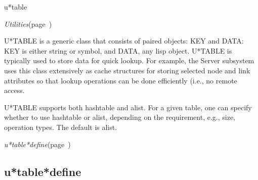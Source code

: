 \begin{description}
\item [Name:]  u*table

\item [Layer:] {\sl Utilities}\hfill(page~\pageref{Utilities})

\item [Description:]

U*TABLE is a generic class that consists of paired objects: KEY
and DATA: KEY is either string or symbol, and DATA, any lisp
object.  U*TABLE is typically used to store data for quick
lookup. For example, the Server subsystem uses this class
extensively as cache structures for storing selected node and
link attributes so that lookup operations can be done
efficiently (i.e., no remote access. 

U*TABLE supports both hashtable and alist. For a given table,
one can specify whether to use hashtable or alist, depending on
the requirement, e.g., size, operation types. The default is
alist.

\item [Attributes:]

\item [Operations:]
\item {\sl u*table*define}\hfill(page~\pageref{u*table*define})

\item [Collections:]

\item [Subclasses:]

\item [Superclasses:]



\end{description}
\horizontalline

\subsection{u*table*define}
\label{u*table*define}

